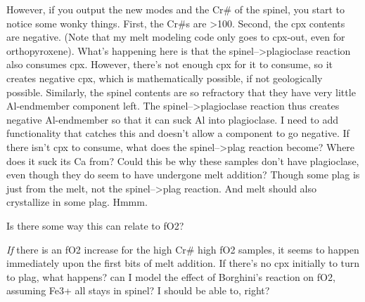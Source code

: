 \documentclass[11pt]{article}
\begin{document}
However, if you output the new modes and the Cr\# of the spinel, you
start to notice some wonky things. First, the Cr\#s are
\textgreater{}100. Second, the cpx contents are negative. (Note that my
melt modeling code only goes to cpx-out, even for orthopyroxene). What's
happening here is that the spinel--\textgreater{}plagioclase reaction
also consumes cpx. However, there's not enough cpx for it to consume, so
it creates negative cpx, which is mathematically possible, if not
geologically possible. Similarly, the spinel contents are so refractory
that they have very little Al-endmember component left. The
spinel--\textgreater{}plagioclase reaction thus creates negative
Al-endmember so that it can suck Al into plagioclase. I need to add
functionality that catches this and doesn't allow a component to go
negative. If there isn't cpx to consume, what does the
spinel--\textgreater{}plag reaction become? Where does it suck its Ca
from? Could this be why these samples don't have plagioclase, even
though they do seem to have undergone melt addition? Though some plag is
just from the melt, not the spinel--\textgreater{}plag reaction. And
melt should also crystallize in some plag. Hmmm.

Is there some way this can relate to fO2?

\emph{If} there is an fO2 increase for the high Cr\# high fO2 samples,
it seems to happen immediately upon the first bits of melt addition. If
there's no cpx initially to turn to plag, what happens? can I model the
effect of Borghini's reaction on fO2, assuming Fe3+ all stays in spinel?
I should be able to, right?
\end{document}
